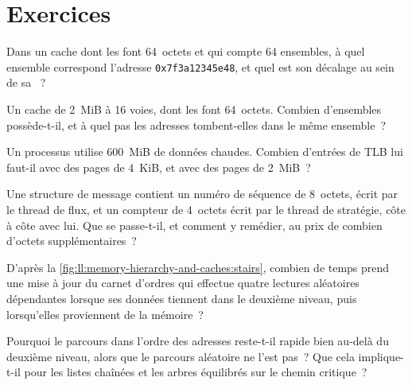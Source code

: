 \section{Exercices}

\begin{exercise}[$\star$]\label{exo:ll:memory-hierarchy-and-caches:1}
Dans un cache dont les  font 64~octets et qui compte 64 ensembles, à quel ensemble correspond l'adresse \texttt{0x7f3a12345e48}, et quel est son décalage
au sein de sa ~?
\end{exercise}

\begin{exercise}[$\star$]\label{exo:ll:memory-hierarchy-and-caches:2}
Un cache de 2~MiB à 16 voies, dont les  font 64~octets. Combien d'ensembles possède-t-il, et à quel pas les adresses tombent-elles dans le
même ensemble~?
\end{exercise}

\begin{exercise}[$\star$]\label{exo:ll:memory-hierarchy-and-caches:3}
Un processus utilise 600~MiB de données chaudes. Combien d'entrées de TLB lui faut-il avec des pages de 4~KiB, et avec des pages de 2~MiB~?
\end{exercise}

\begin{exercise}[$\star\star$]\label{exo:ll:memory-hierarchy-and-caches:4}
Une structure de message contient un numéro de séquence de 8~octets, écrit par le thread de flux, et un compteur de 4~octets
écrit par le thread de stratégie, côte à côte avec lui. Que se passe-t-il, et comment y remédier, au prix de combien d'octets supplémentaires~?
\end{exercise}

\begin{exercise}[$\star\star$]\label{exo:ll:memory-hierarchy-and-caches:5}
D'après la \cref{fig:ll:memory-hierarchy-and-caches:stairs}, combien de temps prend une mise à jour du carnet d'ordres qui effectue quatre lectures aléatoires dépendantes
lorsque ses données tiennent dans le deuxième niveau, puis lorsqu'elles proviennent de la mémoire~?
\end{exercise}

\begin{exercise}[$\star\star$]\label{exo:ll:memory-hierarchy-and-caches:6}
Pourquoi le parcours dans l'ordre des adresses reste-t-il rapide bien au-delà du deuxième niveau, alors que le parcours aléatoire ne l'est pas~? Que
cela implique-t-il pour les listes chaînées et les arbres équilibrés sur le chemin critique~?
\end{exercise}

